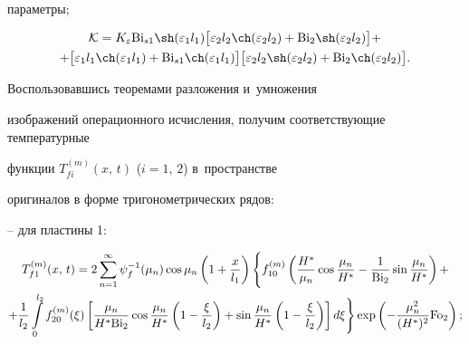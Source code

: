 параметры;

\begin{multline*}\mathcal{K}=

 K_\varepsilon {\rm Bi}_{s1} \sh(\varepsilon _1 l_1) \big[\varepsilon _2 l_2 \ch(\varepsilon _2 l_2 ) + {\rm Bi}_2 \sh(\varepsilon _2 

l_2 )\big] + \\+ \big[\varepsilon _1 l_1 \ch(\varepsilon _1 l_1 ) + {\rm Bi}_{s1} 

\ch(\varepsilon _1 l_1 )\big]

\big[\varepsilon _2 l_2 \sh(\varepsilon _2 l_2 ) + {\rm Bi}_2 

\ch(\varepsilon _2 l_2 )\big].

\end{multline*}










Воспользовавшись теоремами разложения и~умножения 

изображений операционного исчисления, получим соответствующие температурные 

функции $T_{fi}^{(m)} (x,\,t)$ ($i=1,\,2$) в~пространстве 

оригиналов в форме тригонометрических рядов:



-- для пластины 1:





\begin{multline}

 \label{evdok:eq10}

T_{f1}^{(m)} (x,\,t) = 2\sum\limits_{n = 1}^\infty 

\psi _f^{ - 1} (\mu _n )\cos \mu _n \left(1 + \frac{x}{l_1 }\right)

\Bigg\{ f_{10}^{(m)} \left( \frac{H^\ast }{\mu _n }\cos \frac{\mu _n }{H^\ast } - 

\frac{1}{{\rm Bi}_2 }\sin \frac{\mu _n }{H^\ast } \right) +  \\

+ \frac{1}{l_2 }

\int\limits_0^{l_2 } f_{20}^{(m)} (\xi ) \left[ 

\frac{\mu _n }{H^\ast {\rm Bi}_2 }\cos \frac{\mu _n }{H^\ast }\left( {1 - 

\frac{\xi }{l_2 }} \right) + \sin \frac{\mu _n }{H^\ast }\left( {1 - 

\frac{\xi }{l_2 }} \right) \right]d\xi  \Bigg\} \exp \left(  - \frac{\mu 

_n^2 }{(H^\ast )^2}{\rm Fo}_2  \right);

\end{multline}



